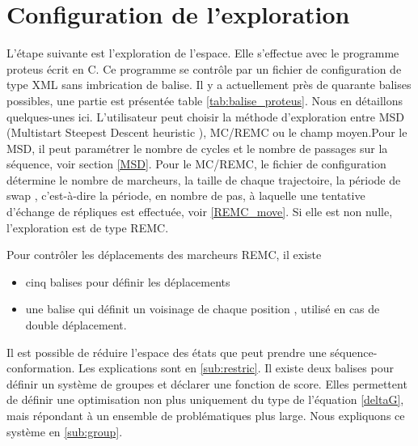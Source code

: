 \section{Configuration de l'exploration}
L'étape suivante est l'exploration de l'espace. Elle s'effectue avec le programme proteus écrit en C. Ce programme se contrôle par un fichier de configuration de type XML sans imbrication de balise. Il y a actuellement près de quarante balises possibles, une partie est présentée table \vref{tab:balise_proteus}. Nous en détaillons quelques-unes ici. L'utilisateur peut choisir la méthode d'exploration entre MSD (\og Multistart Steepest Descent heuristic \fg), MC/REMC ou le champ moyen.Pour le MSD, il peut paramétrer le nombre de cycles et le nombre de passages sur la séquence, voir section \vref{MSD}.
Pour le MC/REMC, le fichier de configuration détermine le nombre de marcheurs, la taille de chaque trajectoire, la période de \og swap \fg, c'est-à-dire la période, en nombre de pas, à laquelle une tentative d'échange de répliques est effectuée, voir \vref{REMC_move}. Si elle est non nulle, l'exploration est de type REMC.

Pour contrôler les déplacements des marcheurs REMC, il existe 
\begin{itemize}
\item cinq  balises pour définir les déplacements
\item une balise qui définit un voisinage de chaque position , utilisé en cas de double déplacement.
\end{itemize}
Il est possible de réduire l'espace des états que peut prendre une séquence-conformation. Les explications sont en \ref{sub:restric}.  Il existe deux balises pour définir un système de groupes et déclarer une fonction de score. Elles permettent de définir une optimisation non plus uniquement du type de l'équation \ref{deltaG}, mais répondant à un ensemble de problématiques plus large. Nous expliquons ce système en \vref{sub:group}.
 
